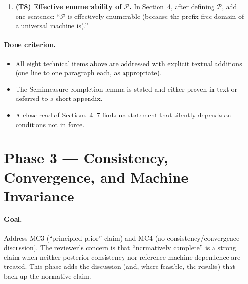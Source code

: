 \documentclass[11pt]{article}
\begin{document}
\begin{enumerate}[leftmargin=*]
\item \textbf{(T8) Effective enumerability of $\mathcal{P}$.} In Section~4, after defining $\mathcal{P}$, add one sentence: ``$\mathcal{P}$ is effectively enumerable (because the prefix-free domain of a universal machine is).''
\end{enumerate}

\paragraph{Done criterion.}
\begin{itemize}[leftmargin=*]
\item All eight technical items above are addressed with explicit textual additions (one line to one paragraph each, as appropriate).
\item The Semimeasure-completion lemma is stated and either proven in-text or deferred to a short appendix.
\item A close read of Sections~4--7 finds no statement that silently depends on conditions not in force.
\end{itemize}

\section{Phase 3 --- Consistency, Convergence, and Machine Invariance}
\label{sec:phase3}

\paragraph{Goal.} Address MC3 (``principled prior'' claim) and MC4 (no consistency/convergence discussion). The reviewer's concern is that ``normatively complete'' is a strong claim when neither posterior consistency nor reference-machine dependence are treated. This phase adds the discussion (and, where feasible, the results) that back up the normative claim.
\end{document}
